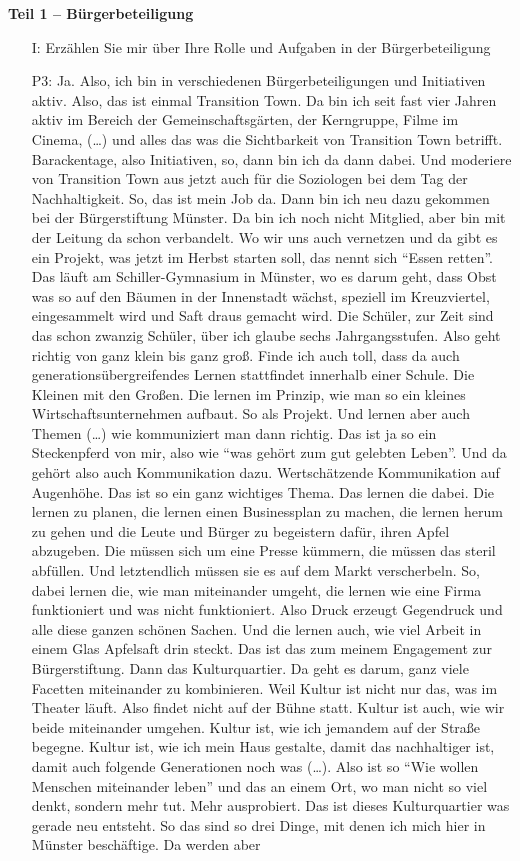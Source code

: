 \textbf{Teil 1 -- B{\"u}rgerbeteiligung}
\begin{itemize}
    \item[I:] Erz{\"a}hlen Sie mir {\"u}ber Ihre Rolle und Aufgaben in der B{\"u}rgerbeteiligung
    \item[P3:] Ja. Also, ich bin in verschiedenen B{\"u}rgerbeteiligungen und Initiativen aktiv. Also, das ist einmal Transition Town. Da bin ich seit fast vier Jahren aktiv im Bereich der Gemeinschaftsg{\"a}rten, der Kerngruppe, Filme im Cinema, (\dots) und alles das was die Sichtbarkeit von Transition Town betrifft. Barackentage, also Initiativen, so, dann bin ich da dann dabei. Und moderiere von Transition Town aus jetzt auch f{\"u}r die Soziologen bei dem Tag der Nachhaltigkeit. So, das ist mein Job da. Dann bin ich neu dazu gekommen bei der B{\"u}rgerstiftung M{\"u}nster. Da bin ich noch nicht Mitglied, aber bin mit der Leitung da schon verbandelt. Wo wir uns auch vernetzen und da gibt es ein Projekt, was jetzt im Herbst starten soll, das nennt sich "`Essen retten"'. Das l{\"a}uft am Schiller-Gymnasium in M{\"u}nster, wo es darum geht, dass Obst was so auf den B{\"a}umen in der Innenstadt w{\"a}chst, speziell im Kreuzviertel, eingesammelt wird und Saft draus gemacht wird. Die Sch{\"u}ler, zur Zeit sind das schon zwanzig Sch{\"u}ler, {\"u}ber ich glaube sechs Jahrgangsstufen. Also geht richtig von ganz klein bis ganz gro{\ss}. Finde ich auch toll, dass da auch generations{\"u}bergreifendes Lernen stattfindet innerhalb einer Schule. Die Kleinen mit den Gro{\ss}en. Die lernen im Prinzip, wie man so ein kleines Wirtschaftsunternehmen aufbaut. So als Projekt. Und lernen aber auch Themen (\dots) wie kommuniziert man dann richtig. Das ist ja so ein Steckenpferd von mir, also wie "`was geh{\"o}rt zum gut gelebten Leben"'. Und da geh{\"o}rt also auch Kommunikation dazu. Wertsch{\"a}tzende Kommunikation auf Augenh{\"o}he. Das ist so ein ganz wichtiges Thema. Das lernen die dabei. Die lernen zu planen, die lernen einen Businessplan zu machen, die lernen herum zu gehen und die Leute und B{\"u}rger zu begeistern daf{\"u}r, ihren Apfel abzugeben. Die m{\"u}ssen sich um eine Presse k{\"u}mmern, die m{\"u}ssen das steril abf{\"u}llen. Und letztendlich m{\"u}ssen sie es auf dem Markt verscherbeln. So, dabei lernen die, wie man miteinander umgeht, die lernen wie eine Firma funktioniert und was nicht funktioniert. Also Druck erzeugt Gegendruck und alle diese ganzen sch{\"o}nen Sachen. Und die lernen auch, wie viel Arbeit in einem Glas Apfelsaft drin steckt. Das ist das zum meinem Engagement zur B{\"u}rgerstiftung. Dann das Kulturquartier. Da geht es darum, ganz viele Facetten miteinander zu kombinieren. Weil Kultur ist nicht nur das, was im Theater l{\"a}uft. Also findet nicht auf der B{\"u}hne statt. Kultur ist auch, wie wir beide miteinander umgehen. Kultur ist, wie ich jemandem auf der Stra{\ss}e begegne. Kultur ist, wie ich mein Haus gestalte, damit das nachhaltiger ist, damit auch folgende Generationen noch was (\dots). Also ist so "`Wie wollen Menschen miteinander leben"' und das an einem Ort, wo man nicht so viel denkt, sondern mehr tut. Mehr ausprobiert. Das ist dieses Kulturquartier was gerade neu entsteht. So das sind so drei Dinge, mit denen ich mich hier in M{\"u}nster besch{\"a}ftige. Da werden aber 
\end{itemize}
